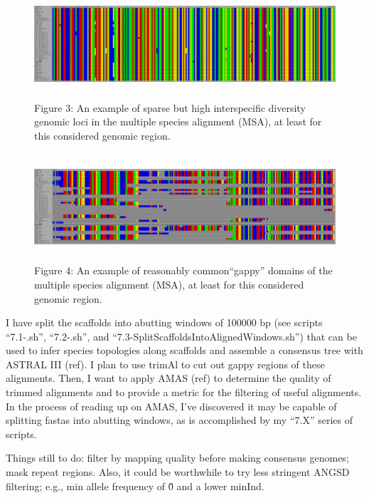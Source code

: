 \documentclass[12pt]{report}
\begin{document}
 \begin{figure}[!h]
         \centering
         \includegraphics[height=4cm]{Images/SeaViewMSA_2.PNG}
         \caption{Figure 3: An example of sparse but high interspecific diversity genomic loci in the multiple species alignment (MSA), at least for this considered genomic region.}
 \end{figure}

 \begin{figure}[!h]
         \centering
         \includegraphics[height=4cm]{Images/SeaViewMSA_3.PNG}
         \caption{Figure 4: An example of reasonably common``gappy'' domains of the multiple species alignment (MSA), at least for this considered genomic region.}
 \end{figure}

I have split the scaffolds into abutting windows of 100000 bp (see scripts ``7.1-.sh'', ``7.2-.sh'', and ``7.3-SplitScaffoldsIntoAlignedWindows.sh'') that can be used to infer species topologies along scaffolds and assemble a consensus tree with ASTRAL III (ref). I plan to use trimAl to cut out gappy regions of these alignments. Then, I want to apply AMAS (ref) to determine the quality of trimmed alignments and to provide a metric for the filtering of useful alignments. In the process of reading up on AMAS, I've discovered it may be capable of splitting fastas into abutting windows, as is accomplished by my ``7.X'' series of scripts.  

Things still to do: filter by mapping quality before making consensus genomes; mask repeat regions. Also, it could be worthwhile to try less stringent ANGSD filtering; e.g., min allele frequency of \~0 and a lower minInd.


\end{document}
